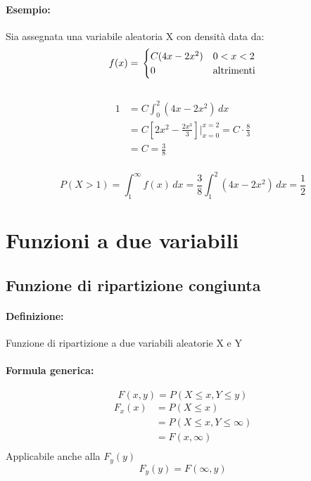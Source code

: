 \documentclass[]{article}
\newcommand{\definizione}{\paragraph{Definizione:}}
\newcommand{\formula}{\paragraph{Formula generica:}}
\begin{document}
    \paragraph{Esempio:} Sia assegnata una variabile aleatoria X con densità data da:
    \begin{equation*}
        f(x) = \\
        \begin{cases}
            C(4x - 2x^2) & 0 < x < 2 \\
            0 & \text{altrimenti}
        \end{cases}
    \end{equation*}
     \\
    \linebreak[4]
    \begin{equation*}
        \begin{split}
            1 & = C \int_{0}^{2} (4x - 2x^2) \, dx\\
            & = C[2x^2 - \frac{2x^3}{3}] \bigg\rvert_{x=0}^{x=2} = C \cdot \frac{8}{3} \\
            & = C = \frac{3}{8}
        \end{split}
    \end{equation*} \\
    \linebreak[4]
    \[ P(X > 1) = \int_{1}^{\infty} f(x) \, dx = \frac{3}{8} \int_{1}^{2}(4x - 2x^2) \, dx = \frac{1}{2} \]
    \newpage
    
    \section{Funzioni a due variabili}

    \subsection{Funzione di ripartizione congiunta}
    \definizione Funzione di ripartizione a due variabili aleatorie X e Y
    \formula \[ F(x, y) = P(X \leq x, Y \leq y) \]
    \begin{equation*}
    \begin{split}
        F_x(x) & = P(X \leq x) \\
        & = P(X \leq x, Y \leq \infty) \\
        & = F(x, \infty) \\
    \end{split}
    \end{equation*}
    Applicabile anche alla $F_y(y)$
    \[ F_y(y) = F(\infty, y) \]
\end{document}
